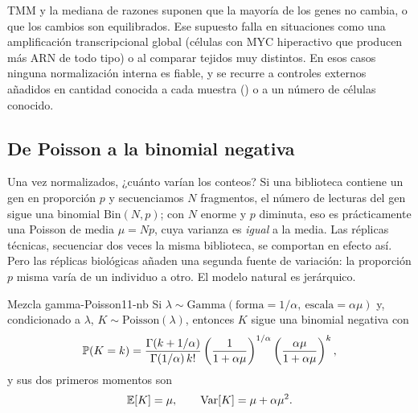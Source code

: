 \begin{cuidado}
TMM y la mediana de razones suponen que la mayoría de los genes no cambia, o que los cambios son equilibrados. Ese supuesto falla en situaciones como una amplificación transcripcional global (células con MYC hiperactivo que producen más ARN de todo tipo) o al comparar tejidos muy distintos. En esos casos ninguna normalización interna es fiable, y se recurre a controles externos añadidos en cantidad conocida a cada muestra () o a un número de células conocido.
\end{cuidado}

\subsection{De Poisson a la binomial negativa}

Una vez normalizados, ¿cuánto varían los conteos? Si una biblioteca contiene un gen en proporción $p$ y secuenciamos $N$ fragmentos, el número de lecturas del gen sigue una binomial $\mathrm{Bin}(N,p)$; con $N$ enorme y $p$ diminuta, eso es prácticamente una Poisson de media $\mu=Np$, cuya varianza es \emph{igual} a la media. Las réplicas técnicas, secuenciar dos veces la misma biblioteca, se comportan en efecto así. Pero las réplicas biológicas añaden una segunda fuente de variación: la proporción $p$ misma varía de un individuo a otro. El modelo natural es jerárquico.

\begin{teorema}{Mezcla gamma-Poisson}{11-nb}
Si $\lambda\sim\mathrm{Gamma}(\text{forma}=1/\alpha,\ \text{escala}=\alpha\mu)$ y, condicionado a $\lambda$, $K\sim\mathrm{Poisson}(\lambda)$, entonces $K$ sigue una binomial negativa con
\begin{equation}\label{eq:11-nbpmf}
\mathbb{P}(K=k)=\frac{\Gamma(k+1/\alpha)}{\Gamma(1/\alpha)\,k!}\left(\frac{1}{1+\alpha\mu}\right)^{1/\alpha}\left(\frac{\alpha\mu}{1+\alpha\mu}\right)^{k},
\end{equation}
y sus dos primeros momentos son
\begin{equation}\label{eq:11-nbvar}
\mathbb{E}[K]=\mu,\qquad \operatorname{Var}[K]=\mu+\alpha\mu^2.
\end{equation}
\end{teorema}

\begin{simbolos}
\end{simbolos}

